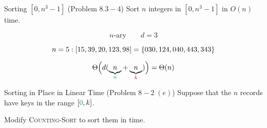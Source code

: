 
\begin{frame}{}
  \begin{exampleblock}{Sorting $[0, n^3-1]$ (Problem $8.3-4$)}
    Sort $n$ integers in $[0, n^3-1]$ in $O(n)$ time.
  \end{exampleblock}

  \pause
  \[
    n\text{-ary} \qquad d = 3
  \]

  \pause
  \[
    n = 5: [15, 39, 20, 123, 98] = \left\{030, 124, 040, 443, 343\right\}
  \]

  \pause
  \[
    \Theta\Big(d (\underbrace{n}_{\textcolor{teal}{n}} + \underbrace{n}_{\textcolor{red}{k}})\Big) = \Theta(n)
  \]
\end{frame}

\begin{frame}{}
  \begin{exampleblock}{Sorting in Place in Linear Time (Problem $8-2\; (e)$)}
    Suppose that the $n$ records have keys in the range $[\textcolor{teal}{0}, k]$.

    Modify \textsc{Counting-Sort} to sort them  in  time.
  \end{exampleblock}

  \begin{columns}
      \pause
      \pause

      \pause
  \end{columns}
\end{frame}

% 
